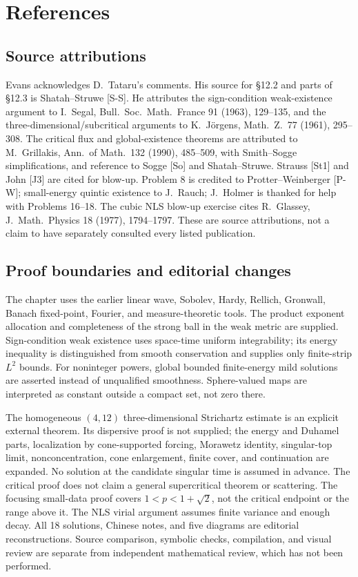 \clearpage
\section{References}
\label{sec:12-7}
\subsection*{Source attributions}
Evans acknowledges D.~Tataru's comments. His source for \S12.2 and
parts of \S12.3 is Shatah--Struwe [S-S]. He attributes the sign-condition
weak-existence argument to I.~Segal, Bull.~Soc.~Math.~France 91 (1963),
129--135, and the three-dimensional/subcritical arguments to K.~J\"orgens,
Math.~Z.~77 (1961), 295--308. The critical flux and global-existence
theorems are attributed to M.~Grillakis, Ann.~of Math.~132 (1990),
485--509, with Smith--Sogge simplifications, and reference to Sogge [So]
and Shatah--Struwe. Strauss [St1] and John [J3] are cited for blow-up.
Problem 8 is credited to Protter--Weinberger [P-W]; small-energy quintic
existence to J.~Rauch; J.~Holmer is thanked for help with Problems 16--18.
The cubic NLS blow-up exercise cites R.~Glassey, J.~Math.~Physics 18
(1977), 1794--1797. These are source attributions, not a claim to have
separately consulted every listed publication.

\subsection*{Proof boundaries and editorial changes}
The chapter uses the earlier linear wave, Sobolev, Hardy, Rellich,
Gronwall, Banach fixed-point, Fourier, and measure-theoretic tools.
The product exponent allocation and completeness of the strong ball
in the weak metric are supplied. Sign-condition weak existence uses
space-time uniform integrability; its energy inequality is distinguished
from smooth conservation and supplies only finite-strip $L^2$ bounds.
For noninteger powers, global bounded finite-energy mild solutions
are asserted instead of unqualified smoothness. Sphere-valued maps
are interpreted as constant outside a compact set, not zero there.

The homogeneous $(4,12)$ three-dimensional Strichartz estimate is an
explicit external theorem. Its dispersive proof is not supplied;
the energy and Duhamel parts, localization by cone-supported forcing,
Morawetz identity, singular-top limit, nonconcentration, cone enlargement,
finite cover, and continuation are expanded. No solution at the candidate
singular time is assumed in advance. The critical proof does not claim
a general supercritical theorem or scattering. The focusing small-data
proof covers $1<p<1+\sqrt2$, not the critical endpoint or the range above
it. The NLS virial argument assumes finite variance and enough decay.
All 18 solutions, Chinese notes, and five diagrams are editorial
reconstructions. Source comparison, symbolic checks, compilation,
and visual review are separate from independent mathematical review,
which has not been performed.
